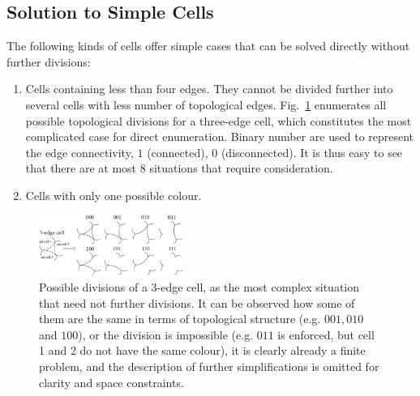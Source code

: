 \documentclass[journal]{IEEEtran}
\begin{document}
\subsection{Solution to Simple Cells}
\label{sec:simple_cell}
The following kinds of cells offer simple cases that can be solved directly without further divisions:
\begin{enumerate}
\item Cells containing less than four edges. They cannot be divided further into several cells with less number of topological edges. Fig.~\ref{figeasycell3} enumerates all possible topological divisions for a three-edge cell, which constitutes the most complicated case for direct enumeration. Binary number are used to represent the edge connectivity, $1$ (connected), $0$ (disconnected). It is thus easy to see that there are at most $8$ situations that require consideration.
\item Cells with only one possible colour.
\end{enumerate}

\begin{figure}[t]
\centering
\includegraphics[width = 0.42\textwidth]{figures/other_figures/cell3}
\caption{Possible divisions of a 3-edge cell, as the most complex situation that need not further divisions. It can be observed how some of them are the same in terms of topological structure (e.g. $001, 010$ and $100$), 
or the division is impossible (e.g. $011$ is enforced, but cell 1 and 2 do not have the same colour), it is clearly already a finite problem, and the description of   further simplifications is omitted for clarity and space constraints.}
\label{figeasycell3}
\end{figure}
\end{document}
